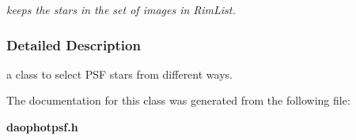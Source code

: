 \begin{CompactItemize}
\begin{CompactList}\small\item\em keeps the stars in the set of images in Rim\-List.\item\end{CompactList}\end{CompactItemize}


\subsubsection{Detailed Description}
a class to select PSF stars from different ways.



The documentation for this class was generated from the following file:\begin{CompactItemize}
\item 
{\bf daophotpsf.h}\end{CompactItemize}
